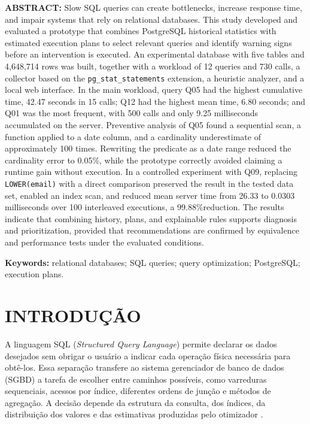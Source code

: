 \documentclass{UNESC}
\newcommand{\codigo}[1]{\texttt{#1}}
\newcommand{\perc}{\%}
\begin{document}
\vspace{1em}
\noindent\textbf{ABSTRACT:} Slow SQL queries can create bottlenecks, increase response time, and impair systems that rely on relational databases. This study developed and evaluated a prototype that combines PostgreSQL historical statistics with estimated execution plans to select relevant queries and identify warning signs before an intervention is executed. An experimental database with five tables and 4,648,714 rows was built, together with a workload of 12 queries and 730 calls, a collector based on the \codigo{pg\_stat\_statements} extension, a heuristic analyzer, and a local web interface. In the main workload, query Q05 had the highest cumulative time, 42.47 seconds in 15 calls; Q12 had the highest mean time, 6.80 seconds; and Q01 was the most frequent, with 500 calls and only 9.25 milliseconds accumulated on the server. Preventive analysis of Q05 found a sequential scan, a function applied to a date column, and a cardinality underestimate of approximately 100 times. Rewriting the predicate as a date range reduced the cardinality error to 0.05\perc, while the prototype correctly avoided claiming a runtime gain without execution. In a controlled experiment with Q09, replacing \codigo{LOWER(email)} with a direct comparison preserved the result in the tested data set, enabled an index scan, and reduced mean server time from 26.33 to 0.0303 milliseconds over 100 interleaved executions, a 99.88\perc reduction. The results indicate that combining history, plans, and explainable rules supports diagnosis and prioritization, provided that recommendations are confirmed by equivalence and performance tests under the evaluated conditions.

\vspace{0.5em}
\noindent\textbf{Keywords:} relational databases; SQL queries; query optimization; PostgreSQL; execution plans.

\section{INTRODUÇÃO}

A linguagem SQL (\textit{Structured Query Language}) permite declarar os dados desejados sem obrigar o usuário a indicar cada operação física necessária para obtê-los. Essa separação transfere ao sistema gerenciador de banco de dados (SGBD) a tarefa de escolher entre caminhos possíveis, como varreduras sequenciais, acessos por índice, diferentes ordens de junção e métodos de agregação. A decisão depende da estrutura da consulta, dos índices, da distribuição dos valores e das estimativas produzidas pelo otimizador \cite{lan2021optimizer}.
\end{document}
